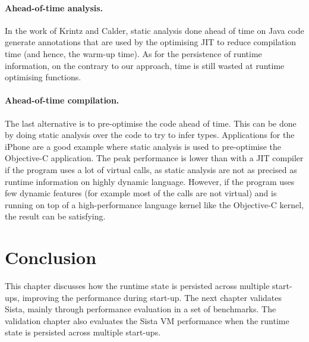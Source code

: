 \documentclass[a4paper,12pt,twoside]{../includes/ThesisStyle}
\begin{document}
\paragraph{Ahead-of-time analysis.}

In the work of Krintz and Calder, static analysis done ahead of time on Java code generate annotations that are used by the optimising JIT to reduce compilation time (and hence, the warm-up time). As for the persistence of runtime information, on the contrary to our approach, time is still wasted at runtime optimising functions.

\paragraph{Ahead-of-time compilation.}

The last alternative is to pre-optimise the code ahead of time. This can be done by doing static analysis over the code to try to infer types. Applications for the iPhone are a good example where static analysis is used to pre-optimise the Objective-C application. The peak performance is lower than with a JIT compiler if the program uses a lot of virtual calls, as static analysis are not as precised as runtime information on highly dynamic language. 
However, if the program uses few dynamic features (for example most of the calls are not virtual) and is running on top of a high-performance language kernel like the Objective-C kernel, the result can be satisfying.


\section*{Conclusion} This chapter discusses how the runtime state is persisted across multiple start-ups, improving the performance during start-up. The next chapter validates Sista, mainly through performance evaluation in a set of benchmarks. The validation chapter also evaluates the Sista VM performance when the runtime state is persisted across multiple start-ups.

\ifx\wholebook\relax\else
    
\end{document}
